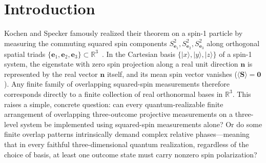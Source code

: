 \documentclass[twocolumn,aps,pra,floatfix,amsmath,amssymb,longbibliography]{revtex4-2}
\newenvironment{handrewrite}{\leavevmode\color{blue}}{}
\theoremstyle{definition}
\theoremstyle{remark}
\newcommand{\R}{\mathbb R}
\begin{document}
\maketitle

\section{Introduction}
\label{sec:intro}

\begin{handrewrite}
Kochen and Specker famously realized their theorem on a spin-1 particle by measuring the commuting squared spin components $S_{\mathbf e_1}^2, S_{\mathbf e_2}^2, S_{\mathbf e_3}^2$ along orthogonal spatial triads $\{\mathbf e_1,\mathbf e_2,\mathbf e_3\}\subset\R^3$~\cite{kochen1}.  In the Cartesian basis $\{|x\rangle,|y\rangle,|z\rangle\}$ of a spin-1 system, the eigenstate with zero spin projection along a real unit direction $\mathbf n$ is represented by the real vector $\mathbf n$ itself, and its mean spin vector vanishes ($\langle\mathbf S\rangle=\mathbf 0$).  Any finite family of overlapping squared-spin measurements therefore corresponds directly to a finite collection of real orthonormal bases in $\R^3$.  This raises a simple, concrete question: can every quantum-realizable finite arrangement of overlapping three-outcome projective measurements on a three-level system be implemented using squared-spin measurements alone?  Or do some finite overlap patterns intrinsically demand complex relative phases---meaning that in every faithful three-dimensional quantum realization, regardless of the choice of basis, at least one outcome state must carry nonzero spin polarization?


\end{handrewrite}
\end{document}
